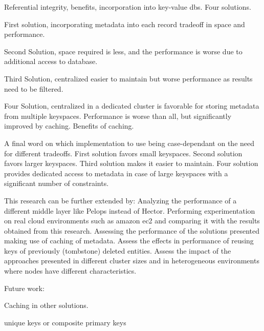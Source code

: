 Referential integrity, benefits, incorporation into key-value dbs. Four
solutions.
	
First solution, incorporating metadata into each record tradeoff in space and
performance.
	
Second Solution, space required is less, and the performance is worse due to
additional access to database.
	
Third Solution, centralized easier to maintain but worse performance as  results
need to be filtered.
	
Four Solution, centralized in a dedicated cluster is favorable for storing
metadata from multiple keyspaces. Performance is worse than all, but
significantly improved by caching. Benefits of caching.
	
A final word on which implementation to use being case-dependant on the need for
different tradeoffs. First solution favors small keyspaces. Second solution
favors larger keyspaces. Third solution makes it easier to maintain. Four
solution provides dedicated access to metadata in case of large keyspaces with a
significant number of constraints.
	
This research can be further extended by:
Analyzing the performance of a different middle layer like Pelops instead of
Hector.
Performing experimentation on real cloud environments such as amazon ec2 and
comparing it with the results obtained from this research.
Assessing the performance of the solutions presented making use of caching of
metadata.
Assess the effects in performance of reusing keys of previously (tombstone)
deleted entities.
Assess the impact of the approaches presented in different cluster sizes and in
heterogeneous environments where nodes have different characteristics.
	
	
	
	
	
	
	
	
Future work:
	
Caching in other solutions.
		
unique keys or composite primary keys
	
	
